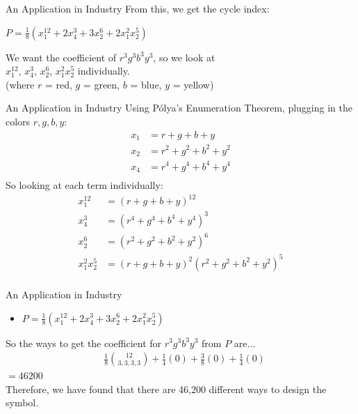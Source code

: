 \documentclass{beamer}
\begin{document}
\begin{frame}{An Application in Industry}
From this, we get the cycle index:\\
\begin{center}
$P = \frac{1}{8}(x_1^{12}+2x_4^3 +3x_2^6 +2x_1^2 x_2^5)$
\end{center}
We want the coefficient of $r^3g^3b^3y^3$, so we look at\\ 
$x_1^{12}$, $x_4^{3}$, $x_2^{6}$, $x_1^{2} x_2^5$ individually.\\
(where $r$ = red, $g$ = green, $b$ = blue, $y$ = yellow)
\end{frame}

\begin{frame}{An Application in Industry}
Using Pólya's Enumeration Theorem, plugging in the colors $r,g,b,y$:\\
\begin{align*}
x_1 &= r+g+b+y\\
x_2 &=r^2+g^2+b^2+y^2\\
x_4 &=r^4+g^4+b^4+y^4\\
\end{align*}
So looking at each term individually:
\begin{align*}
x_1^{12} &= (r+g+b+y)^{12}\\
x_4^3 &=(r^4+g^4+b^4+y^4)^3\\
x_2^6 &=(r^2+g^2+b^2+y^2)^6\\
x_1^{2}x_2^5 &= (r+g+b+y)^2(r^2+g^2+b^2+y^2)^5\\
\end{align*}
\end{frame}

\begin{frame}{An Application in Industry}
\begin{itemize}
\item $P = \frac{1}{8}(x_1^{12}+2x_4^3 +3x_2^6 +2x_1^2 x_2^5)$
\end{itemize}
So the ways to get the coefficient for $r^3g^3b^3y^3$ from $P$ are...\\ 
\begin{align*}
&\frac{1}{8}{{12}\choose{3,3,3,3}}+\frac{1}{4}(0) + \frac{3}{8}(0) + \frac{1}{4}(0)
\end{align*}
$=46200$\\
\vspace{40pt}
Therefore, we have found that there are 46,200 different ways to design the symbol.
\end{frame}
\end{document}
